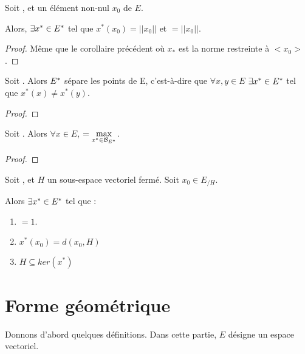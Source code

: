 \begin{corollary}
	Soit , et un élément non-nul $x_{0}$ de $E$.

	Alors, $\exists x^{*} \in E^{*}$ tel que $x^{*}(x_{0}) = ||x_{0}||$ et
	 $= ||x_{0}||$.
\end{corollary}

\begin{proof}
	Même que le corollaire précédent où $x_{*}$ est la norme restreinte à
	$<x_{0}>$.
\end{proof}

\begin{corollary}
	Soit . Alors $E^{*}$ sépare les points de
	E, c'est-à-dire que $\forall x, y \in E$ $\exists x^{*} \in E^{*}$ tel
	que $x^{*}(x) \neq x^{*}(y)$.
\end{corollary}

\begin{proof}
	
\end{proof}

\begin{corollary}
	Soit . Alors $\forall x \in E$,  
	$ = \max\limits_{x^{*} \in \mathcal{B}_{E^{*}}}$.
\end{corollary}

\begin{proof}
	
\end{proof}

\begin{corollary}
	Soit , et $H$ un sous-espace vectoriel fermé.
	Soit $x_{0} \in E_{/H}$.

	Alors $\exists x^{*} \in E^{*}$ tel que :

	\begin{enumerate}
		\item {} $ = 1$.
		\item $x^{*}(x_{0}) = d(x_{0}, H)$
		\item $H \subseteq ker(x^{*})$
	\end{enumerate}
\end{corollary}

\section{Forme géométrique}

Donnons d'abord quelques définitions. Dans cette partie, $E$ désigne un espace
vectoriel.

